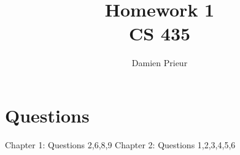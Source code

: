 \documentclass{article}
\author{Damien Prieur}
\title{Homework 1 \\ CS 435}
\date{}
\begin{document}
\maketitle

\section*{Questions}
Chapter 1: Questions 2,6,8,9
Chapter 2: Questions 1,2,3,4,5,6
\end{document}
